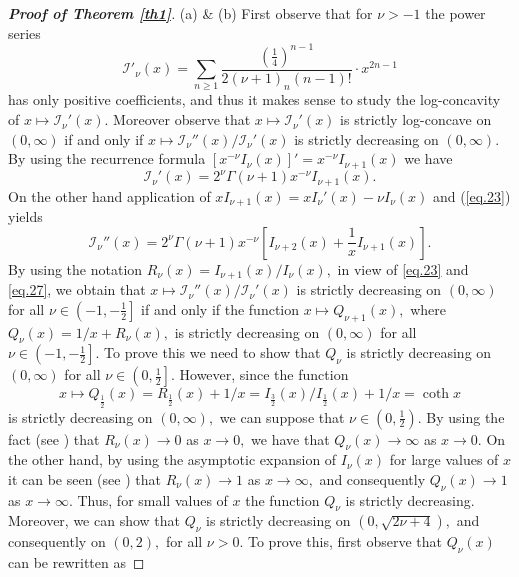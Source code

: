 \documentclass[10pt]{amsart}
\begin{document}
\begin{proof}[\bf Proof of Theorem \ref{th1}]
(a) \& (b) First observe that for $\nu>-1$ the power series
$$\mathcal{I}'_{\nu}(x)=\sum_{n\geq 1}\frac{\left(\frac{1}{4}\right)^{n-1}}{2{(\nu+1)}_n(n-1)!}\cdot x^{2n-1}$$
has only positive coefficients, and thus it makes sense to study
the log-concavity of $x\mapsto\mathcal{I}_{\nu}'(x).$ Moreover observe that $x\mapsto\mathcal{I}_{\nu}'(x)$ is strictly log-concave on $(0,\infty)$ if and only if $x\mapsto
\mathcal{I}_{\nu}''(x)/\mathcal{I}_{\nu}'(x)$ is strictly decreasing on $(0,\infty).$ By using the recurrence formula \cite[p. 79]{watson} $\left[x^{-\nu}I_{\nu}(x)\right]'=x^{-\nu}I_{\nu+1}(x)$ we have
\begin{equation}\label{eq.23}
\mathcal{I}_{\nu}'(x)=2^{\nu}\Gamma(\nu+1)x^{-\nu}I_{\nu+1}(x).\end{equation}
On the other hand application of \cite[p. 79]{watson} $xI_{\nu+1}(x)=xI_{\nu}'(x)-{\nu}I_{\nu}(x)$ and
(\ref{eq.23}) yields
\begin{equation}\label{eq.27}\mathcal{I}_{\nu}''(x)=2^{\nu}\Gamma(\nu+1)x^{-\nu}\left[I_{\nu+2}(x)+\frac{1}{x}I_{\nu+1}(x)\right].\end{equation}
By using the notation $R_{\nu}(x)=I_{\nu+1}(x)/I_{\nu}(x),$ in view of \eqref{eq.23} and \eqref{eq.27}, we obtain that $x\mapsto
\mathcal{I}_{\nu}''(x)/\mathcal{I}_{\nu}'(x)$ is strictly decreasing on $(0,\infty)$ for all $\nu\in\left(-1,-\frac{1}{2}\right]$ if and only if the function $x\mapsto Q_{\nu+1}(x),$ where $Q_{\nu}(x)={1}/{x}+R_{\nu}(x),$ is strictly decreasing on $(0,\infty)$ for all $\nu\in\left(-1,-\frac{1}{2}\right].$ To prove this we need to show that $Q_{\nu}$ is strictly decreasing on $(0,\infty)$ for all $\nu\in\left(0,\frac{1}{2}\right].$ However, since the function
$$x\mapsto Q_{\frac{1}{2}}(x)=R_{\frac{1}{2}}(x)+{1}/{x}={I_{\frac{3}{2}}(x)}/{I_{\frac{1}{2}}(x)}+{1}/{x}=\coth x$$
is strictly decreasing on $(0,\infty),$ we can suppose that $\nu\in\left(0,\frac{1}{2}\right).$ By using the fact (see \cite[p. 446]{yuan}) that $R_{\nu}(x)\to0$ as $x\to 0,$ we have that $Q_{\nu}(x)\to\infty$ as $x\to0.$ On the other hand, by using the asymptotic expansion of $I_{\nu}(x)$ for large values of $x$ it can be seen (see \cite[p. 446]{yuan}) that $R_{\nu}(x)\to1$ as $x\to\infty,$ and consequently $Q_{\nu}(x)\to1$ as $x\to\infty.$ Thus, for small values of $x$ the function $Q_{\nu}$ is strictly decreasing. Moreover, we can show that $Q_{\nu}$ is strictly decreasing on $(0,\sqrt{2\nu+4}),$ and consequently on $(0,2),$ for all $\nu>0.$ To prove this, first observe that $Q_{\nu}(x)$ can be rewritten as

\end{proof}
\end{document}
